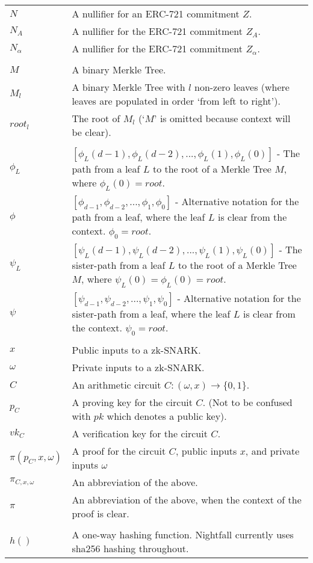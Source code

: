 \documentclass{article}
\begin{document}
\begin{center}
\begin{tabular}{lp{14cm}}
    $N$         & A nullifier for an ERC-721 commitment $Z$.\\
    $N_A$       & A nullifier for the ERC-721 commitment $Z_A$.\\
    $N_{\alpha}$ & A nullifier for the ERC-721 commitment $Z_{\alpha}$.\\
    \\
		$M$         & A binary Merkle Tree.\\
    $M_l$       & A binary Merkle Tree with $l$ non-zero leaves (where leaves are populated in order `from left to right').\\
    $root_l$    & The root of $M_l$ (`$M$' is omitted because context will be clear).\\
    \\
    $\phi_{L}$  & $[\phi_{L}(d-1), \phi_{L}(d-2),..., \phi_{L}(1), \phi_{L}(0)]$ - The path from a leaf $L$ to the root of a Merkle Tree $M$, where $\phi_L(0) = root$.\\
    $\phi$      & $[\phi_{d-1}, \phi_{d-2},..., \phi_{1}, \phi_0]$ - Alternative notation for the path from a leaf, where the leaf $L$ is clear from the context. $\phi_0 = root$.\\
    $\psi_{L}$  & $[\psi_{L}(d-1), \psi_{L}(d-2),..., \psi_{L}(1), \psi_{L}(0)]$ - The sister-path from a leaf $L$ to the root of a Merkle Tree $M$, where $\psi_L(0) = \phi_L(0) = root$.\\
    $\psi$      &  $[\psi_{d-1}, \psi_{d-2},..., \psi_{1}, \psi_0]$ - Alternative notation for the sister-path from a leaf, where the leaf $L$ is clear from the context. $\psi_0 = root$.\\
    \\
		$x$         & Public inputs to a zk-SNARK. \\
		$\omega$    & Private inputs to a zk-SNARK.\\
		$C$         &  An arithmetic circuit $C: (\omega, x) \to \{0,1\}$.\\
		$p_C$       & A proving key for the circuit $C$. (Not to be confused with $pk$ which denotes a public key). \\
		$vk_C$      & A verification key for the circuit $C$. \\
    $\pi(p_C, x, \omega)$ & A proof for the circuit $C$, public inputs $x$, and private inputs $\omega$ \\
    $\pi_{C, x, \omega}$ & An abbreviation of the above. \\
    $\pi$       & An abbreviation of the above, when the context of the proof is clear. \\
    \\
    $h()$       & A one-way hashing function. Nightfall currently uses sha256 hashing throughout.\\
	\end{tabular}
\end{center}
\end{document}
